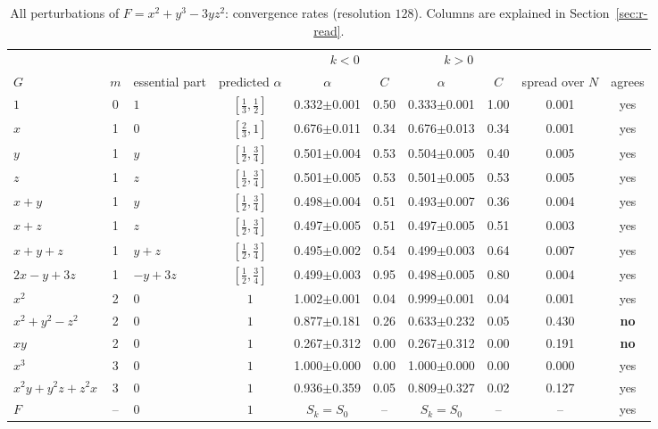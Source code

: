 \documentclass[12pt, a4paper]{article}
\theoremstyle{plain}
\theoremstyle{definition}
\theoremstyle{remark}
\theoremstyle{definition}
\begin{document}
\begin{table}[!h]
\centering
\footnotesize
\begin{adjustbox}{max width=\textwidth}
\begin{tabular}{l c l c c c c c c c}
\toprule
& & & & \multicolumn{2}{c}{$k<0$} & \multicolumn{2}{c}{$k>0$} & & \\
\cmidrule(lr){5-6}\cmidrule(lr){7-8}
$G$ & $m$ & essential part & predicted $\alpha$ & $\alpha$ & $C$ & $\alpha$ & $C$ & spread over $N$ & agrees \\
\midrule
$1$ & 0 & $1$ & $[\tfrac13,\tfrac12]$ & 0.332{\scriptsize$\pm$0.001} & 0.50 & 0.333{\scriptsize$\pm$0.001} & 1.00 & 0.001 & yes \\
$x$ & 1 & $0$ & $[\tfrac23,1]$ & 0.676{\scriptsize$\pm$0.011} & 0.34 & 0.676{\scriptsize$\pm$0.013} & 0.34 & 0.001 & yes \\
$y$ & 1 & $y$ & $[\tfrac12,\tfrac34]$ & 0.501{\scriptsize$\pm$0.004} & 0.53 & 0.504{\scriptsize$\pm$0.005} & 0.40 & 0.005 & yes \\
$z$ & 1 & $z$ & $[\tfrac12,\tfrac34]$ & 0.501{\scriptsize$\pm$0.005} & 0.53 & 0.501{\scriptsize$\pm$0.005} & 0.53 & 0.005 & yes \\
$x+y$ & 1 & $y$ & $[\tfrac12,\tfrac34]$ & 0.498{\scriptsize$\pm$0.004} & 0.51 & 0.493{\scriptsize$\pm$0.007} & 0.36 & 0.004 & yes \\
$x+z$ & 1 & $z$ & $[\tfrac12,\tfrac34]$ & 0.497{\scriptsize$\pm$0.005} & 0.51 & 0.497{\scriptsize$\pm$0.005} & 0.51 & 0.003 & yes \\
$x+y+z$ & 1 & $y + z$ & $[\tfrac12,\tfrac34]$ & 0.495{\scriptsize$\pm$0.002} & 0.54 & 0.499{\scriptsize$\pm$0.003} & 0.64 & 0.007 & yes \\
$2x-y+3z$ & 1 & $-y + 3z$ & $[\tfrac12,\tfrac34]$ & 0.499{\scriptsize$\pm$0.003} & 0.95 & 0.498{\scriptsize$\pm$0.005} & 0.80 & 0.004 & yes \\
$x^2$ & 2 & $0$ & $1$ & 1.002{\scriptsize$\pm$0.001} & 0.04 & 0.999{\scriptsize$\pm$0.001} & 0.04 & 0.001 & yes \\
$x^2+y^2-z^2$ & 2 & $0$ & $1$ & 0.877{\scriptsize$\pm$0.181} & 0.26 & 0.633{\scriptsize$\pm$0.232} & 0.05 & 0.430 & \textbf{no} \\
$xy$ & 2 & $0$ & $1$ & 0.267{\scriptsize$\pm$0.312} & 0.00 & 0.267{\scriptsize$\pm$0.312} & 0.00 & 0.191 & \textbf{no} \\
$x^3$ & 3 & $0$ & $1$ & 1.000{\scriptsize$\pm$0.000} & 0.00 & 1.000{\scriptsize$\pm$0.000} & 0.00 & 0.000 & yes \\
$x^2y+y^2z+z^2x$ & 3 & $0$ & $1$ & 0.936{\scriptsize$\pm$0.359} & 0.05 & 0.809{\scriptsize$\pm$0.327} & 0.02 & 0.127 & yes \\
$F$ & -- & $0$ & $1$ & $S_k=S_0$ & -- & $S_k=S_0$ & -- & -- & yes \\
\bottomrule
\end{tabular}
\end{adjustbox}
\caption[Rates for $x^2+y^3-3yz^2$]{All perturbations of $F=x^2+y^3-3yz^2$: convergence rates (resolution $128$). Columns are explained in Section~\ref{sec:r-read}.}
\label{tab:r-D4b-rates}
\end{table}
\end{document}
